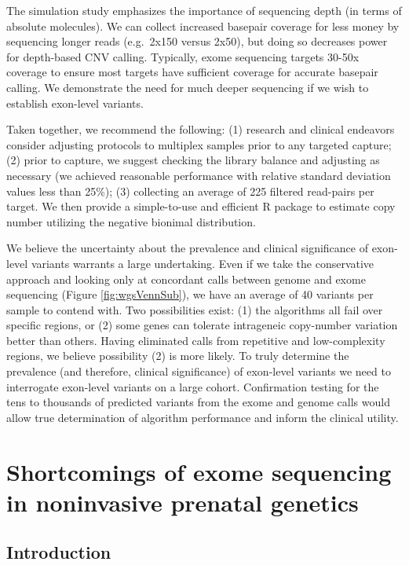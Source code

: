 \documentclass[11pt,letterpaper]{book}
\begin{document}
The simulation study emphasizes the importance of sequencing depth (in terms of absolute molecules).
We can collect increased basepair coverage for less money by sequencing longer reads (e.g.~2x150 versus 2x50), but doing so decreases power for depth-based CNV calling.
Typically, exome sequencing targets 30-50x coverage to ensure most targets have sufficient coverage for accurate basepair calling.
We demonstrate the need for much deeper sequencing if we wish to establish exon-level variants.

Taken together, we recommend the following:
(1) research and clinical endeavors consider adjusting protocols to multiplex samples prior to any targeted capture;
(2) prior to capture, we suggest checking the library balance and adjusting as necessary (we achieved reasonable performance with relative standard deviation values less than 25\%);
(3) collecting an average of 225 filtered read-pairs per target.
We then provide a simple-to-use and efficient R package to estimate copy number utilizing the negative bionimal distribution.

We believe the uncertainty about the prevalence and clinical significance of exon-level variants warrants a large undertaking.
Even if we take the conservative approach and looking only at concordant calls between genome and exome sequencing (Figure \ref{fig:wgsVennSub}), we have an average of 40 variants per sample to contend with.
Two possibilities exist: (1) the algorithms all fail over specific regions, or (2) some genes can tolerate intrageneic copy-number variation better than others.
Having eliminated calls from repetitive and low-complexity regions, we believe possibility (2) is more likely.
To truly determine the prevalence (and therefore, clinical significance) of exon-level variants we need to interrogate exon-level variants on a large cohort.
Confirmation testing for the tens to thousands of predicted variants from the exome and genome calls would allow true determination of algorithm performance and inform the clinical utility.

\hypertarget{shortcomings-of-exome-sequencing-in-noninvasive-prenatal-genetics}{%
\chapter{Shortcomings of exome sequencing in noninvasive prenatal genetics}\label{shortcomings-of-exome-sequencing-in-noninvasive-prenatal-genetics}}

\hypertarget{introduction-1}{%
\section{Introduction}\label{introduction-1}}
\end{document}

